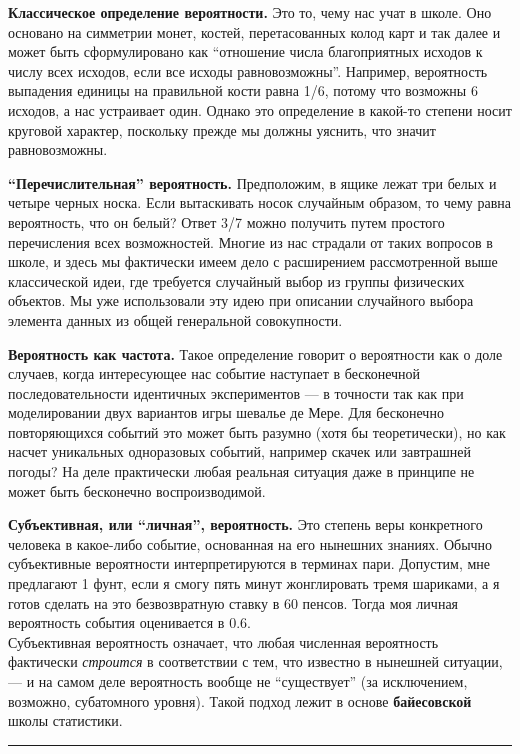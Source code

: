 \documentclass[11pt,a4paper]{article}
\renewcommand{\linethickness}{0.1ex}
\begin{document}
\textbf{Классическое определение вероятности.} Это то, чему нас учат в
школе. Оно основано на симметрии монет, костей, перетасованных колод
карт и так далее и может быть сформулировано как ``отношение числа
благоприятных исходов к числу всех исходов, если все исходы
равновозможны''. Например, вероятность выпадения единицы на правильной
кости равна 1/6, потому что возможны 6 исходов, а нас устраивает один.
Однако это определение в какой-то степени носит круговой характер,
поскольку прежде мы должны уяснить, что значит равновозможны.

\textbf{``Перечислительная'' вероятность.} Предположим, в ящике лежат
три белых и четыре черных носка. Если вытаскивать носок случайным
образом, то чему равна вероятность, что он белый? Ответ 3/7 можно
получить путем простого перечисления всех возможностей. Многие из нас
страдали от таких вопросов в школе, и здесь мы фактически имеем дело с
расширением рассмотренной выше классической идеи, где требуется
случайный выбор из группы физических объектов. Мы уже использовали эту
идею при описании случайного выбора элемента данных из общей генеральной
совокупности.

\textbf{Вероятность как частота.} Такое определение говорит о
вероятности как о доле случаев, когда интересующее нас событие наступает
в бесконечной последовательности идентичных экспериментов --- в точности
так как при моделировании двух вариантов игры шевалье де Мере. Для
бесконечно повторяющихся событий это может быть разумно (хотя бы
теоретически), но как насчет уникальных одноразовых событий, например
скачек или завтрашней погоды? На деле практически любая реальная
ситуация даже в принципе не может быть бесконечно воспроизводимой.

\textbf{Субъективная, или ``личная'', вероятность.} Это степень веры
конкретного человека в какое-либо событие, основанная на его нынешних
знаниях. Обычно субъективные вероятности интерпретируются в терминах
пари. Допустим, мне предлагают 1 фунт, если я смогу пять минут
жонглировать тремя шариками, а я готов сделать на это безвозвратную
ставку в 60 пенсов. Тогда моя личная вероятность события оценивается в
0.6.\\
Субъективная вероятность означает, что любая численная вероятность
фактически \emph{строится} в соответствии с тем, что известно в нынешней
ситуации, --- и на самом деле вероятность вообще не ``существует'' (за
исключением, возможно, субатомного уровня). Такой подход лежит в основе
\textbf{байесовской} школы статистики.

    \begin{center}\rule{0.5\linewidth}{\linethickness}\end{center}
\end{document}
